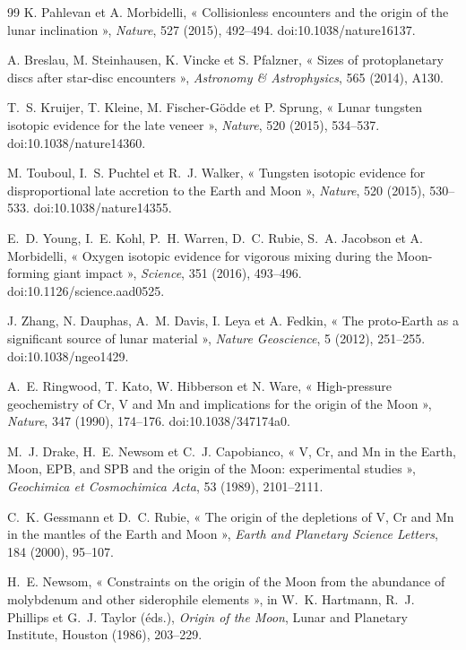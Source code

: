 \documentclass[11pt,a4paper,openany]{report}
\begin{document}
\begin{thebibliography}{99}
 K. Pahlevan et A. Morbidelli, « Collisionless encounters and the
origin of the lunar inclination », \emph{Nature}, 527 (2015), 492--494. doi:10.1038/nature16137.

 A. Breslau, M. Steinhausen, K. Vincke et S. Pfalzner, « Sizes of
protoplanetary discs after star-disc encounters », \emph{Astronomy \& Astrophysics}, 565 (2014),
A130.

 T.~S. Kruijer, T. Kleine, M. Fischer-Gödde et P. Sprung, « Lunar tungsten
isotopic evidence for the late veneer », \emph{Nature}, 520 (2015), 534--537.
doi:10.1038/nature14360.

 M. Touboul, I.~S. Puchtel et R.~J. Walker, « Tungsten isotopic evidence for
disproportional late accretion to the Earth and Moon », \emph{Nature}, 520 (2015), 530--533.
doi:10.1038/nature14355.

 E.~D. Young, I.~E. Kohl, P.~H. Warren, D.~C. Rubie, S.~A. Jacobson et
A. Morbidelli, « Oxygen isotopic evidence for vigorous mixing during the Moon-forming giant
impact », \emph{Science}, 351 (2016), 493--496. doi:10.1126/science.aad0525.

 J. Zhang, N. Dauphas, A.~M. Davis, I. Leya et A. Fedkin, « The proto-Earth as
a significant source of lunar material », \emph{Nature Geoscience}, 5 (2012), 251--255.
doi:10.1038/ngeo1429.


 A.~E. Ringwood, T. Kato, W. Hibberson et N. Ware, « High-pressure
geochemistry of Cr, V and Mn and implications for the origin of the Moon », \emph{Nature}, 347
(1990), 174--176. doi:10.1038/347174a0.

 M.~J. Drake, H.~E. Newsom et C.~J. Capobianco, « V, Cr, and Mn in the Earth,
Moon, EPB, and SPB and the origin of the Moon: experimental studies », \emph{Geochimica et
Cosmochimica Acta}, 53 (1989), 2101--2111.

 C.~K. Gessmann et D.~C. Rubie, « The origin of the depletions of V,
Cr and Mn in the mantles of the Earth and Moon », \emph{Earth and Planetary Science Letters}, 184
(2000), 95--107.

 H.~E. Newsom, « Constraints on the origin of the Moon from the abundance of
molybdenum and other siderophile elements », in W.~K. Hartmann, R.~J. Phillips et G.~J. Taylor
(éds.), \emph{Origin of the Moon}, Lunar and Planetary Institute, Houston (1986), 203--229.


\end{thebibliography}
\end{document}
